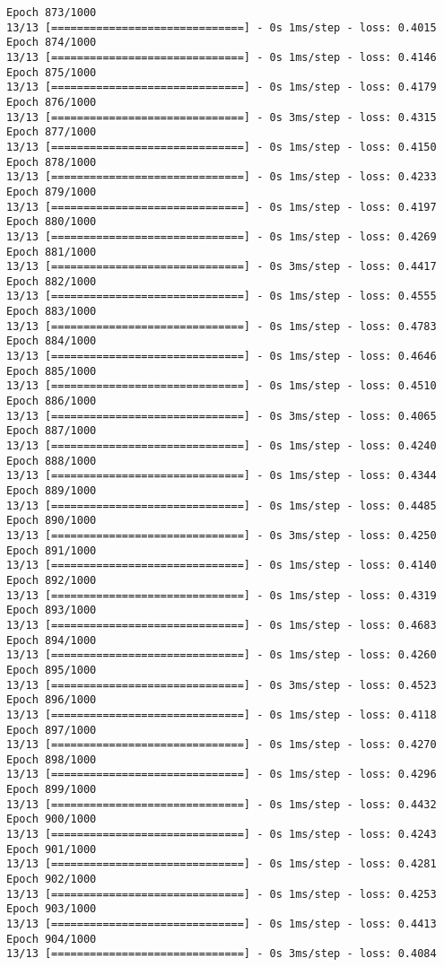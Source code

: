 \documentclass[11pt]{article}
\begin{document}
\begin{Verbatim}[commandchars=\\\{\}]
Epoch 873/1000
13/13 [==============================] - 0s 1ms/step - loss: 0.4015
Epoch 874/1000
13/13 [==============================] - 0s 1ms/step - loss: 0.4146
Epoch 875/1000
13/13 [==============================] - 0s 1ms/step - loss: 0.4179
Epoch 876/1000
13/13 [==============================] - 0s 3ms/step - loss: 0.4315
Epoch 877/1000
13/13 [==============================] - 0s 1ms/step - loss: 0.4150
Epoch 878/1000
13/13 [==============================] - 0s 1ms/step - loss: 0.4233
Epoch 879/1000
13/13 [==============================] - 0s 1ms/step - loss: 0.4197
Epoch 880/1000
13/13 [==============================] - 0s 1ms/step - loss: 0.4269
Epoch 881/1000
13/13 [==============================] - 0s 3ms/step - loss: 0.4417
Epoch 882/1000
13/13 [==============================] - 0s 1ms/step - loss: 0.4555
Epoch 883/1000
13/13 [==============================] - 0s 1ms/step - loss: 0.4783
Epoch 884/1000
13/13 [==============================] - 0s 1ms/step - loss: 0.4646
Epoch 885/1000
13/13 [==============================] - 0s 1ms/step - loss: 0.4510
Epoch 886/1000
13/13 [==============================] - 0s 3ms/step - loss: 0.4065
Epoch 887/1000
13/13 [==============================] - 0s 1ms/step - loss: 0.4240
Epoch 888/1000
13/13 [==============================] - 0s 1ms/step - loss: 0.4344
Epoch 889/1000
13/13 [==============================] - 0s 1ms/step - loss: 0.4485
Epoch 890/1000
13/13 [==============================] - 0s 3ms/step - loss: 0.4250
Epoch 891/1000
13/13 [==============================] - 0s 1ms/step - loss: 0.4140
Epoch 892/1000
13/13 [==============================] - 0s 1ms/step - loss: 0.4319
Epoch 893/1000
13/13 [==============================] - 0s 1ms/step - loss: 0.4683
Epoch 894/1000
13/13 [==============================] - 0s 1ms/step - loss: 0.4260
Epoch 895/1000
13/13 [==============================] - 0s 3ms/step - loss: 0.4523
Epoch 896/1000
13/13 [==============================] - 0s 1ms/step - loss: 0.4118
Epoch 897/1000
13/13 [==============================] - 0s 1ms/step - loss: 0.4270
Epoch 898/1000
13/13 [==============================] - 0s 1ms/step - loss: 0.4296
Epoch 899/1000
13/13 [==============================] - 0s 1ms/step - loss: 0.4432
Epoch 900/1000
13/13 [==============================] - 0s 1ms/step - loss: 0.4243
Epoch 901/1000
13/13 [==============================] - 0s 1ms/step - loss: 0.4281
Epoch 902/1000
13/13 [==============================] - 0s 1ms/step - loss: 0.4253
Epoch 903/1000
13/13 [==============================] - 0s 1ms/step - loss: 0.4413
Epoch 904/1000
13/13 [==============================] - 0s 3ms/step - loss: 0.4084

\end{Verbatim}
\end{document}
